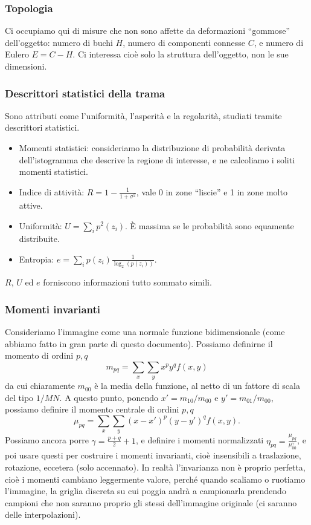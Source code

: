 \documentclass[a4paper,11pt]{article}
\begin{document}
\subsubsection{Topologia}
Ci occupiamo qui di misure che non sono affette da deformazioni ``gommose'' dell'oggetto: numero di buchi $H$, numero di componenti connesse $C$, e numero di Eulero $E = C-H$.
Ci interessa cioè solo la struttura dell'oggetto, non le sue dimensioni.

\subsubsection{Descrittori statistici della trama}
Sono attributi come l'uniformità, l'asperità e la regolarità, studiati tramite descrittori statistici.
\begin{itemize}
    \item Momenti statistici: consideriamo la distribuzione di probabilità derivata dell'istogramma che descrive la regione di interesse, e ne calcoliamo i soliti momenti
    statistici.
    \item Indice di attività: $R = 1 - \frac{1}{1+\sigma^2}$, vale 0 in zone ``liscie'' e 1 in zone molto attive.
    \item Uniformità: $U = \sum_{i}p^2(z_i)$. È massima se le probabilità sono equamente distribuite.
    \item Entropia: $e = \sum_{i}p(z_i) \frac{1}{\log_2(p(z_i))}$.
\end{itemize}
$R$, $U$ ed $e$ forniscono informazioni tutto sommato simili.

\subsubsection{Momenti invarianti}
Consideriamo l'immagine come una normale funzione bidimensionale (come abbiamo fatto in gran parte di questo documento). Possiamo definirne il momento di ordini $p,q$
\[
m_{pq} = \sum_{x}\sum_{y}x^p y^q f(x,y)
\]
da cui chiaramente $m_{00}$ è la media della funzione, al netto di un fattore di scala del tipo $1/MN$. A questo punto, ponendo $x' = m_{10}/m_{00}$ e $y' = m_{01}/m_{00}$,
possiamo definire il momento centrale di ordini $p,q$
\[
\mu_{pq} = \sum_{x}\sum_{y}(x-x')^p (y-y')^q f(x,y).
\]
Possiamo ancora porre $\gamma = \frac{p+q}{2} + 1$, e definire i momenti normalizzati $\eta_{pq}=\frac{\mu_{pq}}{\mu_{00}^\gamma}$, e poi usare questi per costruire
i momenti invarianti, cioè insensibili a traslazione, rotazione, eccetera (solo accennato). In realtà l'invarianza non è proprio perfetta, cioè i momenti cambiano leggermente valore,
perché quando scaliamo o ruotiamo l'immagine, la griglia discreta su cui poggia andrà a campionarla prendendo campioni che non saranno proprio gli stessi dell'immagine originale (ci
saranno delle interpolazioni).
\end{document}
